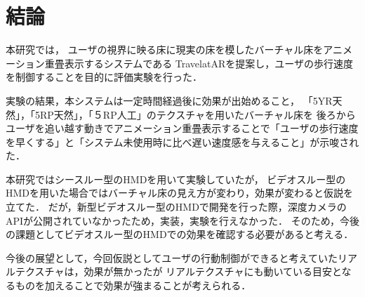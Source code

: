 \chapter{結論}
本研究では，
ユーザの視界に映る床に現実の床を模したバーチャル床をアニメーション重畳表示するシステムである
TravelatARを提案し，ユーザの歩行速度を制御することを目的に評価実験を行った．


実験の結果，本システムは一定時間経過後に効果が出始めること，
「5YR天然」，「5RP天然」，「５RP人工」のテクスチャを用いたバーチャル床を
後ろからユーザを追い越す動きでアニメーション重畳表示することで「ユーザの歩行速度を早くする」と「システム未使用時に比べ遅い速度感を与えること」が示唆された．


本研究ではシースルー型のHMDを用いて実験していたが，
ビデオスルー型のHMDを用いた場合ではバーチャル床の見え方が変わり，効果が変わると仮説を立てた．
だが，新型ビデオスルー型のHMDで開発を行った際，深度カメラのAPIが公開されていなかったため，実装，実験を行えなかった\cite{ocu}．
そのため，今後の課題としてビデオスルー型のHMDでの効果を確認する必要があると考える．

今後の展望として，今回仮説としてユーザの行動制御ができると考えていたリアルテクスチャは，効果が無かったが
リアルテクスチャにも動いている目安となるものを加えることで効果が強まることが考えられる．